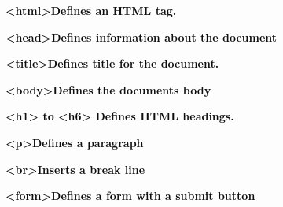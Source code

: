 \documentclass[12pt]{report}
\renewcommand{\_}{\kern-1.5pt\textunderscore\kern-1.5pt}
\begin{document}
\begin{adjustwidth}{0.3in}{0.84in}
\textbf{\textcolor[HTML]{0D0D0D}{<html>\tab \tab \tab Defines an HTML tag.}}\par

\end{adjustwidth}

\begin{adjustwidth}{0.3in}{0.84in}
\textbf{\textcolor[HTML]{0D0D0D}{<head>\tab \tab \tab Defines information about the document}}\par

\end{adjustwidth}

\begin{adjustwidth}{0.3in}{0.84in}
\textbf{\textcolor[HTML]{0D0D0D}{<title>\tab \tab \tab Defines title for the document.}}\par

\end{adjustwidth}

\begin{adjustwidth}{0.3in}{0.84in}
\textbf{\textcolor[HTML]{0D0D0D}{<body>\tab \tab \tab Defines the documents body}}\par

\end{adjustwidth}

\begin{adjustwidth}{0.3in}{0.84in}
\textbf{\textcolor[HTML]{0D0D0D}{<h1> to <h6> \tab \tab Defines HTML headings.}}\par

\end{adjustwidth}

\begin{adjustwidth}{0.3in}{0.84in}
\textbf{\textcolor[HTML]{0D0D0D}{<p>\tab \tab \tab Defines a paragraph}}\par

\end{adjustwidth}

\begin{adjustwidth}{0.3in}{0.84in}
\textbf{\textcolor[HTML]{0D0D0D}{<br>\tab \tab \tab Inserts a break line}}\par

\end{adjustwidth}

\begin{adjustwidth}{0.3in}{0.84in}
\textbf{\textcolor[HTML]{0D0D0D}{<form>\tab \tab \tab Defines a form with a submit button}}\par

\end{adjustwidth}
\end{document}
